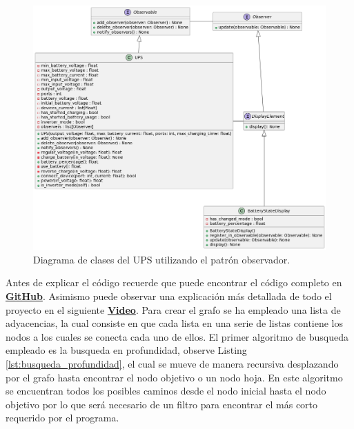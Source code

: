 \documentclass[runningheads]{llncs}
\begin{document}
        \begin{figure}[H]
            \centering
            \includegraphics[width=\textwidth]{uml_ups}
            \caption{Diagrama de clases del UPS utilizando el patrón observador.}
            \label{fig:uml_ups}
        \end{figure}

        Antes de explicar el código recuerde que puede encontrar el código completo en \href{https://github.com/Alexander-Guacan/Proyecto_Unidad_3.git}{\textbf{GitHub}}. Asimismo puede observar una explicación más detallada de todo el proyecto en el siguiente \href{https://drive.google.com/file/d/1ghD_tkJbnypSG6MpYKVSDKDXMLQJQLaC/view?usp=sharing}{\textbf{Video}}. Para crear el grafo se ha empleado una lista de adyacencias, la cual consiste en que cada lista en una serie de listas contiene los nodos a los cuales se conecta cada uno de ellos. El primer algoritmo de busqueda empleado es la busqueda en profundidad, observe Listing \ref{lst:busqueda_profundidad}, el cual se mueve de manera recursiva desplazando por el grafo hasta encontrar el nodo objetivo o un nodo hoja. En este algoritmo se encuentran todos los posibles caminos desde el nodo inicial hasta el nodo objetivo por lo que será necesario de un filtro para encontrar el más corto requerido por el programa.

        
        
\end{document}
